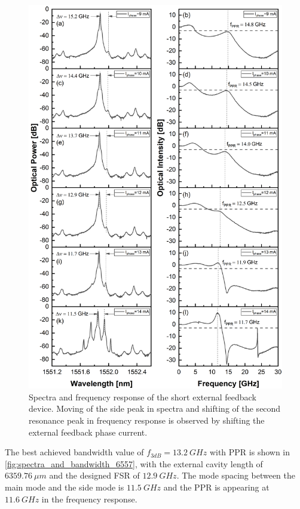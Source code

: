 \begin{figure}[H]
    \centering
    \includegraphics[width=.9\linewidth]{figures/spectra_and_bandwidth_6559.png}
    \caption{Spectra and frequency response of the short external feedback device. Moving of the side peak in spectra and shifting of the second resonance peak in frequency response is observed by shifting the external feedback phase current.}
    \label{fig:spectra_and_bandwidth_6559}
\end{figure}

The best achieved bandwidth value of $f_{3dB}=13.2 \ GHz$ with PPR is shown in \autoref{fig:spectra_and_bandwidth_6557}, with the external cavity length of $6359.76 \ \mu m$ and the designed FSR of $12.9 \ GHz$. The mode spacing between the main mode and the side mode is $11.5 \ GHz$ and the PPR is appearing at $11.6 \ GHz$ in the frequency response.

